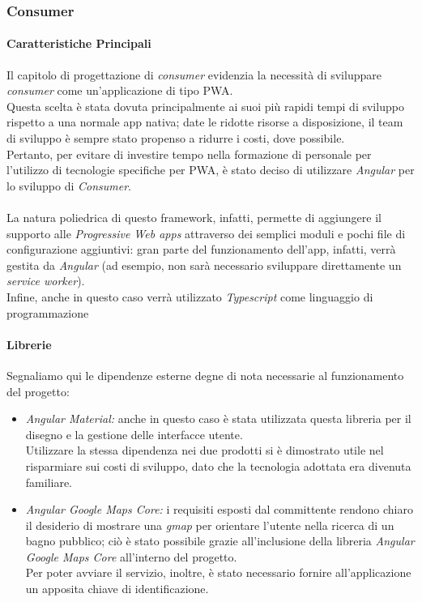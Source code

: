 \documentclass[12pt]{article}
\begin{document}
\subsubsection{Consumer}
\paragraph{Caratteristiche Principali}
Il capitolo di progettazione di \textit{consumer} evidenzia la necessità di sviluppare \textit{consumer} come un'applicazione di tipo PWA.\\
Questa scelta è stata dovuta principalmente ai suoi più rapidi tempi di sviluppo rispetto a una normale app nativa; date le ridotte risorse a disposizione, il team di sviluppo è sempre stato propenso a ridurre i costi, dove possibile.\\
Pertanto, per evitare di investire tempo nella formazione di personale per l'utilizzo di tecnologie specifiche per PWA, è stato deciso di utilizzare \textit{Angular} per lo sviluppo di \textit{Consumer}.\\\\
La natura poliedrica di questo framework, infatti, permette di aggiungere il supporto alle \textit{Progressive Web apps} attraverso dei semplici moduli e pochi file di configurazione aggiuntivi: gran parte del funzionamento dell'app, infatti, verrà gestita da \textit{Angular} (ad esempio, non sarà necessario sviluppare direttamente un \textit{service worker}).\\
Infine, anche in questo caso verrà utilizzato \textit{Typescript} come linguaggio di programmazione
\paragraph{Librerie}

Segnaliamo qui le dipendenze esterne degne di nota necessarie al funzionamento del progetto:
\begin{itemize}
\item \textit{Angular Material:} anche in questo caso è stata utilizzata questa libreria per il disegno e la gestione delle interfacce utente.\\
Utilizzare la stessa dipendenza nei due prodotti si è dimostrato utile nel risparmiare sui costi di sviluppo, dato che la tecnologia adottata era divenuta familiare.
\item \textit{Angular Google Maps Core:} i requisiti esposti dal committente rendono chiaro il desiderio di mostrare una \textit{gmap} per orientare l'utente nella ricerca di un bagno pubblico; ciò è stato possibile grazie all'inclusione della libreria \textit{Angular Google Maps Core} all'interno del progetto.\\
Per poter avviare il servizio, inoltre, è stato necessario fornire all'applicazione un apposita chiave di identificazione.

\end{itemize}
\end{document}
